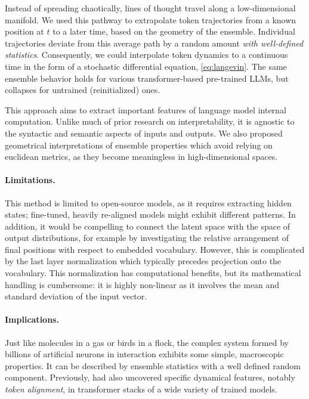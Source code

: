 \documentclass{article} %
\newcommand{\nb}[1]{{\color{teal} NB: #1}} %
\begin{document}
Instead of spreading chaotically, lines of thought travel along a low-dimensional manifold.
We used this pathway to extrapolate token trajectories from a known position at $t$ to a later time, based on the geometry of the ensemble. Individual trajectories deviate from this average path by a random amount \emph{with well-defined statistics}. 
Consequently, we could interpolate token dynamics to a continuous time in the form of a stochastic differential equation, \cref{eq:langevin}. 
The same ensemble behavior holds for various transformer-based pre-trained LLMs, but collapses for untrained (reinitialized) ones.

This approach aims to extract important features of language model internal computation.
Unlike much of prior research on interpretability, it is agnostic to the syntactic and semantic aspects of inputs and outputs.
We also proposed geometrical interpretations of ensemble properties which avoid relying on euclidean metrics, as they become meaningless in high-dimensional spaces.

\paragraph{Limitations.} 
This method is limited to open-source models, as it requires extracting hidden states; fine-tuned, heavily re-aligned models might exhibit different patterns.
In addition, it would be compelling to connect the latent space with the space of output distributions, for example by investigating the relative arrangement of final positions with respect to embedded vocabulary.
However, this is complicated by the last layer normalization which typically precedes projection onto the vocabulary.
This normalization has computational benefits, but its mathematical handling is cumbersome: it is highly non-linear as it involves the mean and standard deviation of the input vector.



\paragraph{Implications.}
Just like molecules in a gas or birds in a flock, the complex system formed by billions of artificial neurons in interaction exhibits some simple, macroscopic properties.
It can be described by ensemble statistics with a well defined random component.
Previously, \citet{aubry2024transformeralignmentlargelanguage} had also uncovered specific dynamical features, notably \emph{token alignment}, in transformer stacks of a wide variety of trained models.
\end{document}
